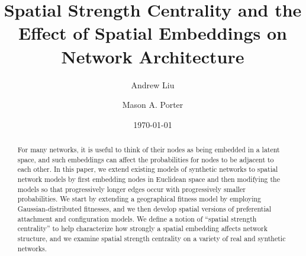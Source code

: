 \documentclass[%
 reprint,
 amsmath,amssymb,
 aps,
]{revtex4-1}
\begin{document}


\title{Spatial Strength Centrality and the Effect of Spatial Embeddings on Network Architecture}

\author{Andrew Liu}

\author{Mason A. Porter}

\date{\today}%

\begin{abstract}

For many networks, it is useful to think of their nodes as being embedded in a latent space, and such embeddings can affect the probabilities for nodes to be adjacent to each other. In this paper, we extend existing models of synthetic networks to spatial network models by first embedding nodes in Euclidean space and then modifying the models so that progressively longer edges occur with progressively smaller probabilities.
We start by extending a geographical fitness model by employing Gaussian-distributed fitnesses, and we then develop spatial versions of preferential attachment and configuration models. We define a notion of ``spatial strength centrality'' to help characterize how strongly a spatial embedding affects network structure, and we examine spatial strength centrality on a variety of real and synthetic networks.

\end{abstract}

\maketitle


\end{document}
